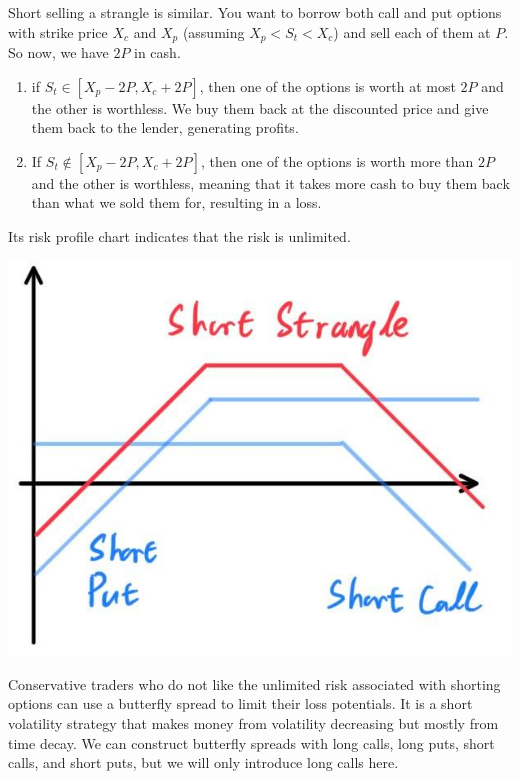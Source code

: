 \documentclass{article}
\begin{document}
\begin{definition}
Short selling a strangle is similar. You want to borrow both call and put options with strike price $X_c$ and $X_p$ (assuming $X_p < S_t < X_c$) and sell each of them at $P$. So now, we have $2P$ in cash. 
\begin{enumerate}
    \item if $S_t \in [X_p - 2P, X_c + 2P]$, then one of the options is worth at most $2P$ and the other is worthless. We buy them back at the discounted price and give them back to the lender, generating profits. 
    
    \item If $S_t \not\in [X_p - 2P, X_c + 2P]$, then one of the options is worth more than $2P$ and the other is worthless, meaning that it takes more cash to buy them back than what we sold them for, resulting in a loss. 
\end{enumerate}
Its risk profile chart indicates that the risk is unlimited. 
\begin{center}
    \includegraphics[scale=0.3]{img/short_strangle.jpg}
\end{center}
\end{definition}

Conservative traders who do not like the unlimited risk associated with shorting options can use a butterfly spread to limit their loss potentials. It is a short volatility strategy that makes money from volatility decreasing but mostly from time decay. We can construct butterfly spreads with long calls, long puts, short calls, and short puts, but we will only introduce long calls here. 
\end{document}
